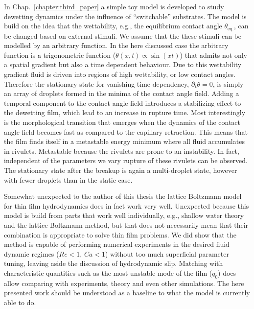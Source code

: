 In Chap.~\ref{chapter:third_paper} a simple toy model is developed to study dewetting dynamics under the influence of ``switchable'' substrates.
The model is build on the idea that the wettability, e.g., the equilibrium contact angle $\theta_{\text{eq.}}$, can be changed based on external stimuli. 
We assume that the these stimuli can be modelled by an arbitrary function.
In the here discussed case the arbitrary function is a trigonometric function ($\theta(x,t) \propto \sin(x t)$) that admits not only a spatial gradient but also a time dependent behaviour.
Due to this wettability gradient fluid is driven into regions of high wettability, or low contact angles.
Therefore the stationary state for vanishing time dependency, $\partial_t\theta = 0$, is simply an array of droplets formed in the minima of the contact angle field.
Adding a temporal component to the contact angle field introduces a stabilizing effect to the dewetting film, which lead to an increase in rupture time.
Most interestingly is the morphological transition that emerges when the dynamics of the contact angle field becomes fast as compared to the capillary retraction.
This means that the film finds itself in a metastable energy minimum where all fluid accumulates in rivulets.
Metastable because the rivulets are prone to an instability. 
In fact, independent of the parameters we vary rupture of these rivulets can be observed. 
The stationary state after the breakup is again a multi-droplet state, however with fewer droplets than in the static case.

Somewhat unexpected to the author of this thesis the lattice Boltzmann model for thin film hydrodynamics does in fact work very well. 
Unexpected because this model is build from parts that work well individually, e.g., shallow water theory and the lattice Boltzmann method, but that does not necessarily mean that their combination is appropriate to solve thin film problems.  
We did show that the method is capable of performing numerical experiments in the desired fluid dynamic regimes ($Re < 1$, $Ca < 1$) without too much superficial parameter tuning, leaving aside the discussion of hydrodynamic slip. 
Matching with characteristic quantities such as the most unstable mode of the film ($q_0$) does allow comparing with experiments, theory and even other simulations.
The here presented work should be understood as a baseline to what the model is currently able to do.

